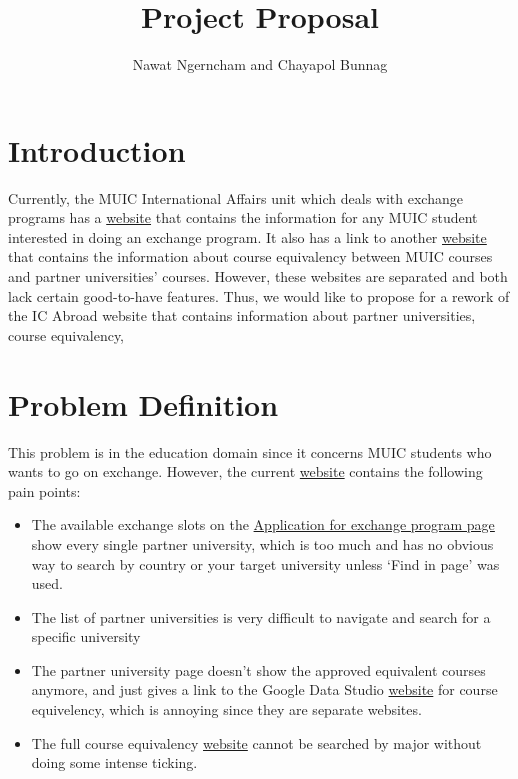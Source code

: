 \documentclass{report}
\author{Nawat Ngerncham and Chayapol Bunnag}
\title{Project Proposal}
\begin{document}
\maketitle

\section*{Introduction}
Currently, the MUIC International Affairs unit which deals with
exchange programs has a \href{https://sites.google.com/mahidol.edu/icabroad/home}
{website} that contains the information for any MUIC student
interested in doing an exchange program. It also has a link
to another \href{https://datastudio.google.com/u/0/reporting/99a044ff-1412-494e-a8b4-eb8a821bbc53/page/X3alC}
{website} that contains the information about course equivalency
between MUIC courses and partner universities' courses.
However, these websites are separated and both lack certain
good-to-have features. Thus, we would like to propose for a
rework of the IC Abroad website that contains information
about partner universities, course equivalency, 

\section*{Problem Definition}
This problem is in the education domain since
it concerns MUIC students who wants to go on exchange. However,
the current \href{https://sites.google.com/mahidol.edu/icabroad/home}
{website} contains the following pain points:

\begin{itemize}
    \item The available exchange slots on the
        \href{https://sites.google.com/mahidol.edu/icabroad/application-for-exchange-program}
        {Application for exchange program page} show every single
        partner university, which is too much and has no obvious
        way to search by country or your target university unless
        `Find in page' was used.
    \item The list of partner universities is very difficult to 
        navigate and search for a specific university
    \item The partner university page doesn't show the approved
        equivalent courses anymore, and just gives a link to the 
        Google Data Studio \href{https://datastudio.google.com/u/0/reporting/99a044ff-1412-494e-a8b4-eb8a821bbc53/page/X3alC}
        {website} for course equivelency, which is annoying since
        they are separate websites.
    \item The full course equivalency \href{https://datastudio.google.com/u/0/reporting/99a044ff-1412-494e-a8b4-eb8a821bbc53/page/X3alC}
        {website} cannot be searched by major without doing some
        intense ticking.
\end{itemize}
\end{document}
